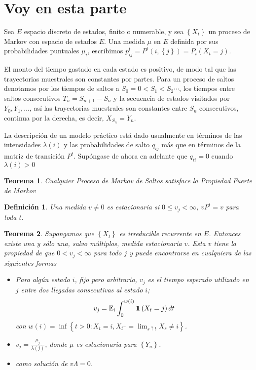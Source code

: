 \documentclass{article}
\newtheorem{Def}{Definición}[section]
\newtheorem{Teo}{Teorema}[section]
\newcommand{\esp}{\mathbb{E}}
\newcommand{\indora}{\mbox{$1$\hspace{-0.8ex}$1$}}
\numberwithin{equation}{section}
\begin{document}
\section{Voy en esta parte}

Sea $E$ espacio discreto de estados, finito o numerable, y sea $\left\{X_{t}\right\}$ un proceso de Markov con espacio de estados $E$. Una medida $\mu$ en $E$ definida por sus probabilidades puntuales $\mu_{i}$, escribimos $p_{ij}^{t}=P^{t}\left(i,\left\{j\right\}\right)=P_{i}\left(X_{t}=j\right)$.

El monto del tiempo gastado en cada estado es positivo, de modo tal que las trayectorias muestrales son constantes por partes. Para un proceso de saltos denotamos por los tiempos de saltos a $S_{0}=0<S_{1}<S_{2}\cdots$, los tiempos entre saltos consecutivos $T_{n}=S_{n+1}-S_{n}$ y la secuencia de estados visitados por $Y_{0},Y_{1},\ldots$, as\'i las trayectorias muestrales son constantes entre $S_{n}$ consecutivos, continua por la derecha, es decir, $X_{S_{n}}=Y_{n}$. 

La descripci\'on de un modelo pr\'actico est\'a dado usualmente en t\'erminos de las intensidades $\lambda\left(i\right)$ y las probabilidades de salto $q_{ij}$ m\'as que en t\'erminos de la matriz de transici\'on $P^{t}$. Sup\'ongase de ahora en adelante que $q_{ii}=0$ cuando $\lambda\left(i\right)>0$

\begin{Teo}
Cualquier Proceso de Markov de Saltos satisface la Propiedad
Fuerte de Markov
\end{Teo}

\begin{Def}
Una medida $v\neq0$ es estacionaria si $0\leq v_{j}<\infty$, $vP^{t}=v$ para toda $t$.
\end{Def}

\begin{Teo}\label{Teo.4.2}
Supongamos que $\left\{X_{t}\right\}$ es irreducible recurrente en $E$. Entonces existe una y s\'olo una, salvo m\'ultiplos, medida estacionaria $v$. Esta $v$ tiene la propiedad de que $0<v_{j}<\infty$ para todo $j$ y puede encontrarse en cualquiera de las siguientes formas

\begin{itemize}
\item[i)] Para alg\'un estado $i$, fijo pero arbitrario, $v_{j}$ es el tiempo esperado utilizado en $j$ entre dos llegadas consecutivas al estado $i$;
\begin{equation}\label{Eq.4.2}
v_{j}=\esp_{i}\int_{0}^{w\left(i\right)}\indora\left(X_{t}=j\right)dt
\end{equation}
con $w\left(i\right)=\inf\left\{t>0:X_{t}=i,X_{t^{-}}=\lim_{s\uparrow t}X_{s}\neq i\right\}$. 
\item[ii)]
$v_{j}=\frac{\mu_{j}}{\lambda\left(j\right)}$, donde $\mu$ es estacionaria para $\left\{Y_{n}\right\}$. \item[iii)] como
soluci\'on de $v\Lambda=0$.
\end{itemize}
\end{Teo}
\end{document}
